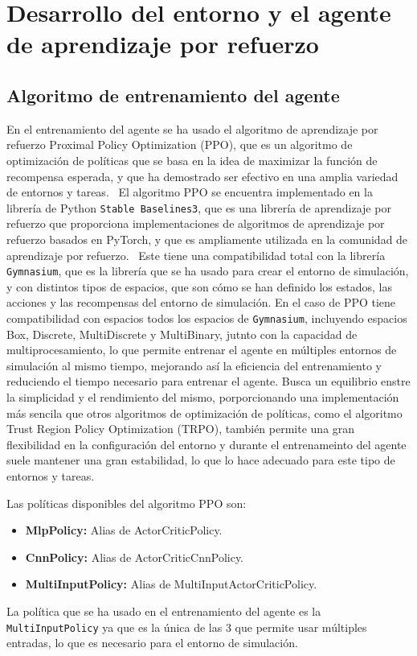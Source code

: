 \section{Desarrollo del entorno y el agente de aprendizaje por refuerzo}

\subsection{Algoritmo de entrenamiento del agente}
En el entrenamiento del agente se ha usado el algoritmo de aprendizaje por refuerzo Proximal Policy Optimization (PPO), que es un algoritmo de optimización de políticas que se basa en la idea de maximizar la función de recompensa esperada, y que ha demostrado ser efectivo en una amplia variedad de entornos y tareas.~\cite{Siboo2023, Yu2022}
El algoritmo PPO se encuentra implementado en la librería de Python \texttt{Stable Baselines3}, que es una librería de aprendizaje por refuerzo que proporciona implementaciones de algoritmos de aprendizaje por refuerzo basados en PyTorch, y que es ampliamente utilizada en la comunidad de aprendizaje por refuerzo.~\cite{Raffin2021}
Este tiene una compatibilidad total con la librería \texttt{Gymnasium}, que es la librería que se ha usado para crear el entorno de simulación, y con distintos tipos de espacios, que son cómo se han definido los estados, las acciones y las recompensas del entorno de simulación. En el caso de PPO tiene compatibilidad con espacios todos los espacios de \texttt{Gymnasium}, incluyendo espacios Box, Discrete, MultiDiscrete y MultiBinary, jutnto con la capacidad de multiprocesamiento, lo que permite entrenar el agente en múltiples entornos de simulación al mismo tiempo, mejorando así la eficiencia del entrenamiento y reduciendo el tiempo necesario para entrenar el agente.
Busca un equilibrio enstre la simplicidad y el rendimiento del mismo, porporcionando una implementación más sencila que otros algoritmos de optimización de políticas, como el algoritmo Trust Region Policy Optimization (TRPO), también permite una gran flexibilidad en la configuración del entorno y durante el entrenameinto del agente suele mantener una gran estabilidad, lo que lo hace adecuado para este tipo de entornos y tareas.

Las políticas disponibles del algoritmo PPO son:
\begin{itemize}
    \item \textbf{MlpPolicy:} Alias de ActorCriticPolicy.
    \item \textbf{CnnPolicy:} Alias de ActorCriticCnnPolicy.
    \item \textbf{MultiInputPolicy:} Alias de MultiInputActorCriticPolicy.
\end{itemize}
La política que se ha usado en el entrenamiento del agente es la \texttt{MultiInputPolicy} ya que es la única de las 3 que permite usar múltiples entradas, lo que es necesario para el entorno de simulación.

